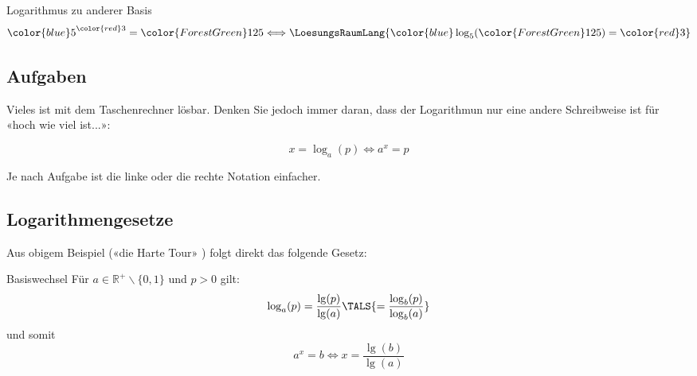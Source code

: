  \begin{beispiel}{Logarithmus zu anderer Basis}{}
$$   {\color{blue}5}^{\color{red}3} = {\color{ForestGreen}125}
   \Longleftrightarrow \LoesungsRaumLang{{\color{blue}\log_5}({\color{ForestGreen}125}) = {\color{red}3}}$$
   \end{beispiel}
 

\subsection*{Aufgaben}

Vieles ist mit dem Taschenrechner lösbar. Denken Sie jedoch immer
daran, dass der Logarithmun nur eine andere Schreibweise ist für «hoch
wie viel ist...»:

$$x=\log_a(p) \Longleftrightarrow  a^x=p$$

Je nach Aufgabe ist die linke oder die rechte Notation einfacher.



\newpage



 \subsection{Logarithmengesetze}
Aus obigem Beispiel («die Harte Tour» ) folgt direkt das folgende Gesetz:

\begin{gesetz}{Basiswechsel}{}
  Für $a\in\mathbb{R}^{+}\backslash\{0,1\}$ und $p>0$ gilt:
  $$\log_a(p) = \frac{\lg(p)}{\lg(a)}\TALS{ =
    \frac{\log_b(p)}{\log_b(a)}}$$
  und somit
  $$a^x=b \Longleftrightarrow x= \frac{\lg(b)}{\lg(a)}$$
\end{gesetz}


